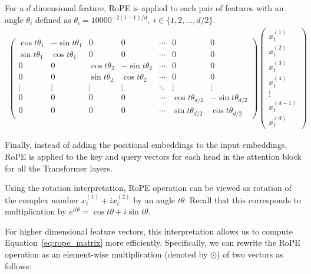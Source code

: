 \begin{parts}
For a $d$ dimensional feature, RoPE is applied to each pair of features with an angle $\theta_i$ defined as $\theta_i = 10000^{-2(i-1)/d},\ i \in \{1, 2, \ldots, d/2\}$.
\begin{align}
    \label{eq:rope_matrix}
    \begin{pmatrix}
    \cos t\theta_1 & -\sin t\theta_1 & 0 & 0 & \cdots & 0 & 0\\
    \sin t\theta_1 & \cos t\theta_1 & 0 & 0 & \cdots & 0 & 0\\
    0 & 0 & \cos t\theta_2 & -\sin t\theta_2 & \cdots & 0 & 0\\
    0 & 0 & \sin t\theta_2 & \cos t\theta_2 & \cdots & 0 & 0\\
    \vdots & \vdots & \vdots & \vdots & \ddots & \vdots & \vdots\\
    0 & 0 & 0 & 0 & \cdots & \cos t\theta_{d/2} & -\sin t\theta_{d/2}\\
    0 & 0 & 0 & 0 & \cdots & \sin t\theta_{d/2} & \cos t\theta_{d/2}
    \end{pmatrix}
    \begin{pmatrix}
        x^{(1)}_t \\ x^{(2)}_t \\ x^{(3)}_t \\ x^{(4)}_t \\ \vdots \\ x^{(d-1)}_t \\ x^{(d)}_t 
    \end{pmatrix}
\end{align}


Finally, instead of adding the positional embeddings to the input embeddings, RoPE is applied to the key and query vectors for each head in the attention block for all the Transformer layers.

\begin{subparts}

\subpart[2] 
Using the rotation interpretation, RoPE operation can be viewed as rotation of the complex number $x^{(1)}_t + i x^{(2)}_t$ by an angle $t\theta$. Recall that this corresponds to multiplication by $e^{it\theta} = \cos t\theta + i \sin t\theta$.

For higher dimensional feature vectors, this interpretation allows us to compute Equation~\ref{eq:rope_matrix} more efficiently. Specifically, we can rewrite the RoPE operation as an element-wise multiplication (denoted by $\odot$) of two vectors as follows:


\end{subparts}
\end{parts}
